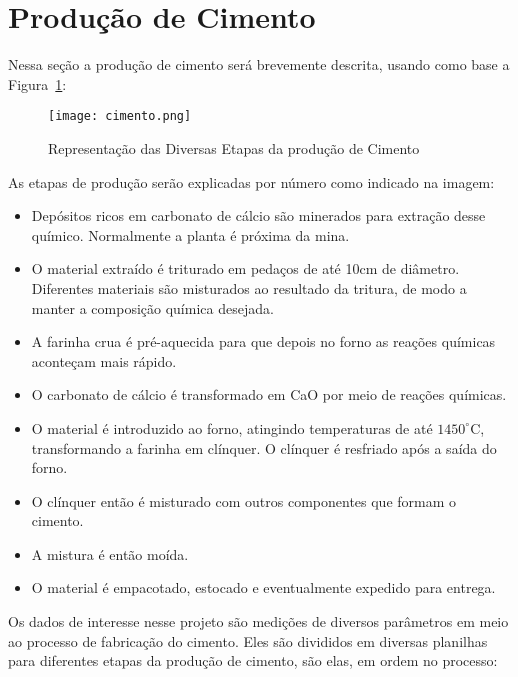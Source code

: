 \section{Produção de Cimento}
\label{sec:producao}

Nessa seção a produção de cimento será brevemente descrita, usando como base a Figura~\ref{fig:cimento}:  

\begin{figure}[H]
\centering
\texttt{[image: cimento.png]}
\caption{Representação das Diversas Etapas da produção de Cimento \citep{cementroadmap}}
\label{fig:cimento}
\end{figure}


As etapas de produção serão explicadas por número como indicado na imagem: \\

\begin{itemize}

\item[1] Depósitos ricos em carbonato de cálcio são minerados para extração desse químico. Normalmente a planta é próxima da mina.
\item[2] O material extraído é triturado em pedaços de até 10cm de diâmetro. Diferentes materiais são misturados ao resultado da tritura, de modo a manter a composição química desejada. 
\item[3] A farinha crua é pré-aquecida para que depois no forno as reações químicas aconteçam mais rápido. 
\item[4] O carbonato de cálcio é transformado em CaO por meio de reações químicas.  
\item[5] O material é introduzido ao forno, atingindo temperaturas de até $1450^\circ$C, transformando a farinha em clínquer. O clínquer é resfriado após a saída do forno. 
\item[6] O clínquer então é misturado com outros componentes que formam o cimento.
\item[7] A mistura é então moída.
\item[8] O material é empacotado, estocado e eventualmente expedido para entrega.

\end{itemize}

Os dados de interesse nesse projeto são medições de diversos parâmetros em meio ao processo de fabricação do cimento. Eles são divididos em diversas planilhas para diferentes etapas da produção de cimento, são elas, em ordem no processo:

